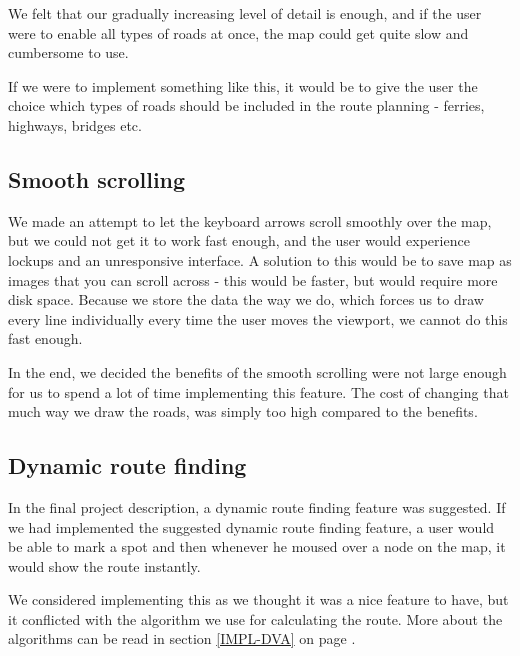 We felt that our gradually increasing level of detail is enough, and if the user were 
to enable all types of roads at once, the map could get quite slow and cumbersome 
to use.

If we were to implement something like this, it would be to give the user the choice 
which types of roads should be included in the route planning - ferries, highways, 
bridges etc.

\subsection{Smooth scrolling}
\label{UIA-NI-SS}
We made an attempt to let the keyboard arrows scroll smoothly over the map, but
we could not get it to work fast enough, and the user would experience
lockups and an unresponsive interface. A solution to this would
be to save map as images that you can scroll across - this would be faster, but
would require more disk space. Because we store the data the way we do, which 
forces us to draw every line individually every time the user moves the viewport, 
we cannot do this fast enough.

In the end, we decided the benefits of the smooth scrolling were not large enough
for us to spend a lot of time implementing this feature. The cost of changing that  
much way we draw the roads, was simply too high compared to the benefits.

\subsection{Dynamic route finding}
\label{UIA-NI-DRF}
In the final project description, a dynamic route finding feature was
suggested. If we had implemented the suggested dynamic route finding feature, a
user would be able to mark a spot and then whenever he moused over a node on the
map, it would show the route instantly.

We considered implementing this as we thought it was a
nice feature to have, but it conflicted with the algorithm we use for
calculating the route. More about the algorithms can be read in section
\ref{IMPL-DVA}  on page \pageref{IMPL-DVA}.
